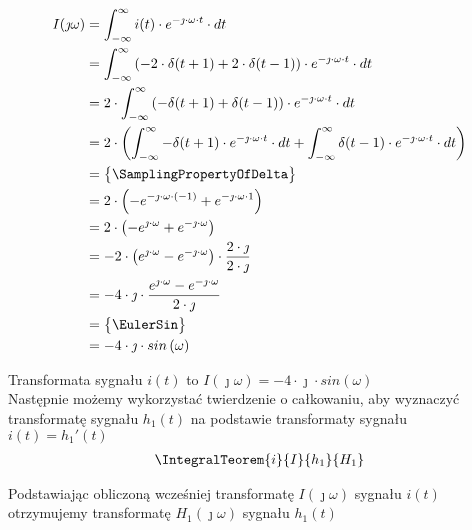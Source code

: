 \begin{task}
\begin{align*}
I(\jmath \omega )&=\int_{-\infty }^{\infty}i(t) \cdot e^{-\jmath \cdot \omega \cdot t}\cdot dt\\
&=\int_{-\infty }^{\infty}\left( -2 \cdot \delta(t+1) + 2 \cdot \delta(t-1)\right) \cdot e^{-\jmath \cdot \omega \cdot t}\cdot dt\\
&=2 \cdot \int_{-\infty }^{\infty} \left( -\delta(t+1) + \delta(t-1) \right) \cdot e^{-\jmath \cdot \omega \cdot t}\cdot dt\\
&=2 \cdot \left( \int_{-\infty }^{\infty} -\delta(t+1) \cdot e^{-\jmath \cdot \omega \cdot t}\cdot dt + \int_{-\infty }^{\infty} \delta(t-1) \cdot e^{-\jmath \cdot \omega \cdot t}\cdot dt \right)\\
&=\begin{Bmatrix}
\SamplingPropertyOfDelta
\end{Bmatrix}\\
&= 2 \cdot \left( -e^{-\jmath \cdot \omega \cdot (-1)} + e^{-\jmath \cdot \omega \cdot 1} \right)\\
&= 2 \cdot \left( -e^{\jmath \cdot \omega} + e^{-\jmath \cdot \omega} \right)\\
&= -2 \cdot \left( e^{\jmath \cdot \omega} - e^{-\jmath \cdot \omega} \right) \cdot \frac{2 \cdot \jmath}{2 \cdot \jmath}\\
&= -4 \cdot \jmath \cdot \frac{ e^{\jmath \cdot \omega} - e^{-\jmath \cdot \omega} }{2 \cdot \jmath} \\
&=\begin{Bmatrix}
\EulerSin
\end{Bmatrix}\\
&= -4 \cdot \jmath \cdot sin\left( \omega\right) \\
\end{align*}

Transformata sygnału $i(t)$ to $I(\jmath \omega)=-4 \cdot \jmath \cdot sin\left( \omega\right)$
\\

Następnie możemy wykorzystać twierdzenie o całkowaniu, aby wyznaczyć transformatę sygnału $h_1(t)$ na podstawie transformaty sygnału $i(t)=h_1'(t)$
\begin{align*}
\IntegralTeorem{i}{I}{h_1}{H_1}
\end{align*}

Podstawiając obliczoną wcześniej transformatę $I(\jmath \omega)$ sygnału $i(t)$ otrzymujemy transformatę $H_1(\jmath \omega)$ sygnału $h_1(t)$


\end{task}
